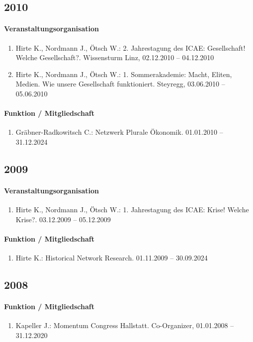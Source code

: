 \subsection*{2010}
\paragraph{Veranstaltungsorganisation}
\begin{enumerate}[leftmargin=*, labelsep=0.5cm]
\item Hirte K., Nordmann J., Ötsch W.: 2. Jahrestagung des ICAE: Gesellschaft! Welche Gesellschaft?. Wissensturm Linz, 02.12.2010 -- 04.12.2010
\item Hirte K., Nordmann J., Ötsch W.: 1. Sommerakademie: Macht, Eliten, Medien. Wie unsere Gesellschaft funktioniert. Steyregg, 03.06.2010 -- 05.06.2010
\end{enumerate}

\paragraph{Funktion / Mitgliedschaft}
\begin{enumerate}[leftmargin=*, labelsep=0.5cm]
\item Gräbner-Radkowitsch C.: Netzwerk Plurale Ökonomik. 01.01.2010 -- 31.12.2024
\end{enumerate}
\subsection*{2009}
\paragraph{Veranstaltungsorganisation}
\begin{enumerate}[leftmargin=*, labelsep=0.5cm]
\item Hirte K., Nordmann J., Ötsch W.: 1. Jahrestagung des ICAE: Krise! Welche Krise?. 03.12.2009 -- 05.12.2009
\end{enumerate}

\paragraph{Funktion / Mitgliedschaft}
\begin{enumerate}[leftmargin=*, labelsep=0.5cm]
\item Hirte K.: Historical Network Research. 01.11.2009 -- 30.09.2024
\end{enumerate}
\subsection*{2008}
\paragraph{Funktion / Mitgliedschaft}
\begin{enumerate}[leftmargin=*, labelsep=0.5cm]
\item Kapeller J.: Momentum Congress Hallstatt. Co-Organizer, 01.01.2008 -- 31.12.2020
\end{enumerate}